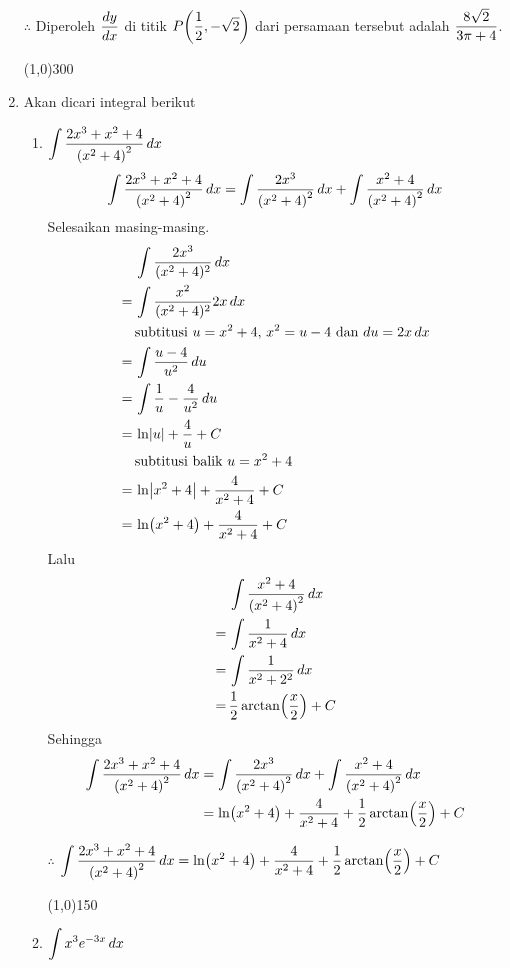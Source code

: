 \begin{enumerate}[leftmargin=*, label={\arabic*}.]
$\therefore$ Diperoleh $\ds \frac{dy}{dx}$ di titik $\ds P\brk*{\frac{1}{2},-\sqrt{2}}$ dari 
persamaan tersebut adalah $\ds \frac{8\sqrt{2}}{3\pi+4}$.
\begin{center}
    \line(1,0){300}
\end{center}
\item Akan dicari integral berikut
\begin{enumerate}[label={\alph*}.]
    \item $\ds \int\frac{2x^{3}+x^{2}+4}{\brk*{x^{2}+4}^{2}}\,dx$
    \[
        \int\frac{2x^{3}+x^{2}+4}{\brk*{x^{2}+4}^{2}}\,dx
        = \int\frac{2x^{3}}{\brk*{x^{2}+4}^{2}}\,dx
        +\int\frac{x^{2}+4}{\brk*{x^{2}+4}^{2}}\,dx
    \]
    Selesaikan masing-masing.
    \begin{align*}
        &\int \frac{2x^{3}}{(x^{2}+4)^2}\,dx\\
        =\,&\int \frac{x^{2}}{(x^{2}+4)^2}2x\,dx\\
        &\text{subtitusi $u=x^{2}+4$, $x^{2}=u-4$ dan $du = 2x\,dx$}\\
        =\,&\int \frac{u-4}{u^2}\,du\\
        =\,&\int \frac{1}{u}-\frac{4}{u^{2}}\,du\\
        =\,&\ln\abs{u}+\frac{4}{u}+C\\
        &\text{subtitusi balik $u=x^{2}+4$}\\
        =\,&\ln\abs*{x^{2}+4}+\frac{4}{x^{2}+4}+C\\
        =\,&\ln\brk*{x^{2}+4}+\frac{4}{x^{2}+4}+C
    \end{align*}
    Lalu 
    \begin{align*}
        &\int\frac{x^{2}+4}{\brk*{x^{2}+4}^{2}}\,dx\\
        =\,&\int\frac{1}{x^{2}+4}\,dx\\
        =\,&\int\frac{1}{x^{2}+2^{2}}\,dx\\
        =\,&\frac{1}{2}\arctan\brk*{\frac{x}{2}}+C
    \end{align*}
    Sehingga 
    \begin{align*}
        \int\frac{2x^{3}+x^{2}+4}{\brk*{x^{2}+4}^{2}}\,dx
        &= \int\frac{2x^{3}}{\brk*{x^{2}+4}^{2}}\,dx
        +\int\frac{x^{2}+4}{\brk*{x^{2}+4}^{2}}\,dx\\
        &=\ln\brk*{x^{2}+4}+\frac{4}{x^{2}+4}+\frac{1}{2}\arctan\brk*{\frac{x}{2}}+C
    \end{align*}

    $\therefore$ $\ds \int\frac{2x^{3}+x^{2}+4}{\brk*{x^{2}+4}^{2}}\,dx
    =\ln\brk*{x^{2}+4}+\frac{4}{x^{2}+4}+\frac{1}{2}\arctan\brk*{\frac{x}{2}}+C$
\begin{center}
    \line(1,0){150}
\end{center}
    \item $\ds \int x^{3}e^{-3x}\,dx$
    

\end{enumerate}
\end{enumerate}
